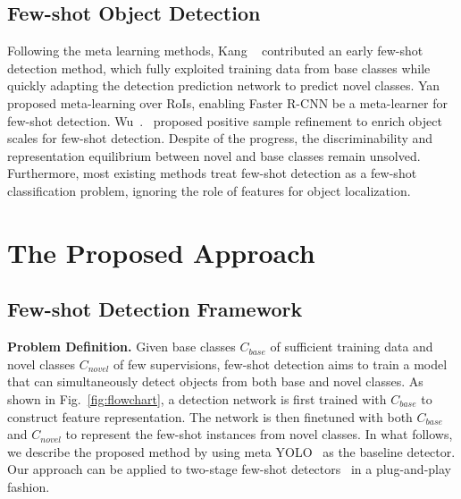\documentclass[final]{cvpr}
\begin{document}
\subsection{Few-shot Object Detection}
Following the meta learning methods, Kang \etal~\cite{FeatureReweighting} contributed an early few-shot detection method, which fully exploited training data from base classes while quickly adapting the detection prediction network to predict novel classes. Yan~\etal~\cite{MetaRCNN} proposed meta-learning over RoIs, enabling Faster R-CNN be a meta-learner for few-shot detection. 
Wu~\etal.~\cite{MPSR} proposed positive sample refinement to enrich object scales for few-shot detection. Despite of the progress, the discriminability and representation equilibrium between novel and base classes remain unsolved. Furthermore, most existing methods treat few-shot detection as a few-shot classification problem, ignoring the role of features for object localization. 

\section{The Proposed Approach}

\iffalse
\begin{align}
   F^Q = f_{\theta}(I^Q)\\
   \mathop{\arg\min}_{\theta} \mathcal{L}_{Det}(\mathcal{P}(F^Q\otimes v_i),M^Q)\\
   \mathcal{L}_{Det} = \mathcal{L}_c+\mathcal{L}_{bbx}+\mathcal{L}_{obj}\\
   \mathcal{L}_T = \mathcal{L}_{Det}+\mathcal{L}_{Mrg}\\
   G_{xy} = \frac{\partial {\mathcal{L}}_T}{\partial I_{xy}^S}\\
   T(G_{xy})=\begin{cases}
0& G_{xy}\geq \tau\\
1& else
\end{cases}\\
    M_{xy}^{S (t)} = M_{xy}^{S (t-1)}\times T(G_{xy})\\
    v_i = f_{\theta}(I^S, M^S(t))\\
    \mathcal{L}_{ftn} = \mathcal{L}_{Det}+\mathcal{L}_{Mrg}\\
\end{align}
\fi

\subsection{Few-shot Detection Framework}
\textbf{Problem Definition.}
Given base classes $C_{base}$ of sufficient training data and novel classes $C_{novel}$ of few supervisions, few-shot detection aims to train a model that can simultaneously detect objects from both base and novel classes. As shown in Fig.\ \ref{fig:flowchart}, a detection network is first trained with $C_{base}$ to construct feature representation. The network is then finetuned with both $C_{base}$ and $C_{novel}$ to represent the few-shot instances from novel classes. In what follows, we describe the proposed method by using meta YOLO~\cite{FeatureReweighting} as the baseline detector. Our approach can be applied to two-stage few-shot detectors~\cite{MPSR} in a plug-and-play fashion.
\end{document}
